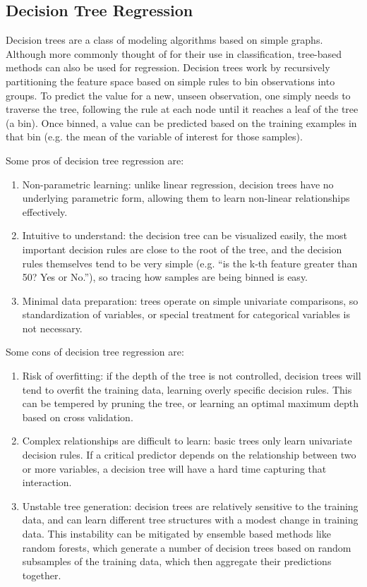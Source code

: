 \documentclass[12pt]{article}
\begin{document}

\subsection{Decision Tree Regression} %
\label{sub:decision_tree_regression}

Decision trees are a class of modeling algorithms based on simple graphs.
Although more commonly thought of for their use in classification, tree-based methods can also be used for regression. 
Decision trees work by recursively partitioning the feature space based on simple rules to bin observations into groups.
To predict the value for a new, unseen observation, one simply needs to traverse the tree, following the rule at each node until it reaches a leaf of the tree (a bin).
Once binned, a value can be predicted based on the training examples in that bin (e.g. the mean of the variable of interest for those samples).

Some pros of decision tree regression are:
\begin{enumerate}
  \item Non-parametric learning: unlike linear regression, decision trees have no underlying parametric form, allowing them to learn non-linear relationships effectively.
  \item Intuitive to understand: the decision tree can be visualized easily, the most important decision rules are close to the root of the tree, and the decision rules themselves tend to be very simple (e.g. ``is the k-th feature greater than 50? Yes or No.''), so tracing how samples are being binned is easy.
  \item Minimal data preparation: trees operate on simple univariate comparisons, so standardization of variables, or special treatment for categorical variables is not necessary.
\end{enumerate}

Some cons of decision tree regression are:
\begin{enumerate}
  \item Risk of overfitting: if the depth of the tree is not controlled, decision trees will tend to overfit the training data, learning overly specific decision rules. This can be tempered by pruning the tree, or learning an optimal maximum depth based on cross validation.
  \item Complex relationships are difficult to learn: basic trees only learn univariate decision rules. If a critical predictor depends on the relationship between two or more variables, a decision tree will have a hard time capturing that interaction.
  \item Unstable tree generation: decision trees are relatively sensitive to the training data, and can learn different tree structures with a modest change in training data. This instability can be mitigated by ensemble based methods like random forests, which generate a number of decision trees based on random subsamples of the training data, which then aggregate their predictions together.
\end{enumerate}
\end{document}
